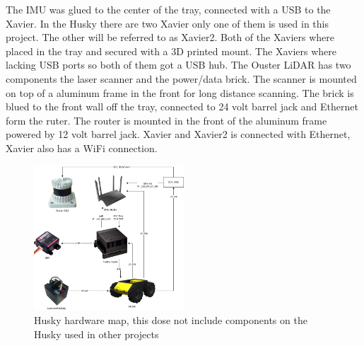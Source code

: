 The IMU was glued to the center of the tray, connected with a USB to the Xavier. In the Husky there are two Xavier only one of them is used in this project. The other will be referred to as Xavier2. Both of the Xaviers where placed in the tray and secured with a 3D printed mount. The Xaviers where lacking USB ports so both of them got a USB hub. 
The Ouster LiDAR has two components the laser scanner and the power/data brick. The scanner is mounted on top of a aluminum frame in the front for long distance scanning. The brick is blued to the front wall off the tray, connected to 24 volt barrel jack and Ethernet form the ruter. 
The router is mounted in the front of the aluminum frame powered by 12 volt barrel jack. Xavier and Xavier2 is connected with Ethernet, Xavier also has a WiFi connection. 
\begin{figure}[H]
    \centering
    \includegraphics[width = 0.5\textwidth]{Figures/drawio/Husky_HW.drawio.png}
    \caption{Husky hardware map, this dose not include components on the Husky used in other projects}
    \label{fig:Husky_HW}
\end{figure}

